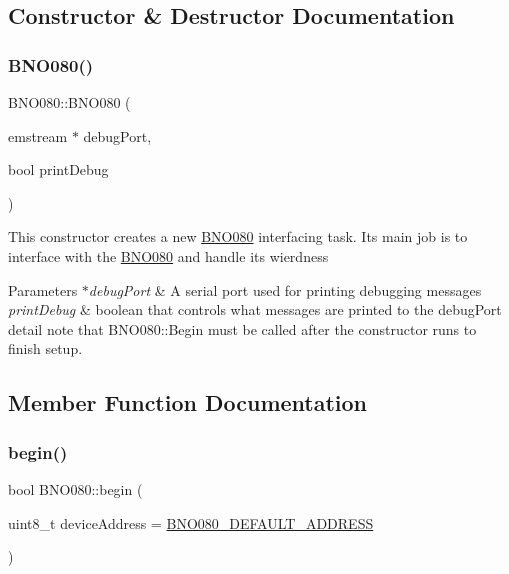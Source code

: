 \subsection{Constructor \& Destructor Documentation}
\mbox{\label{classBNO080_a587f2ceae4b35e407cb76141f371e297}} 
\subsubsection{\texorpdfstring{BNO080()}{BNO080()}}
{\footnotesize\ttfamily B\+N\+O080\+::\+B\+N\+O080 (\begin{DoxyParamCaption}\item[{emstream $\ast$}]{debug\+Port,  }\item[{bool}]{print\+Debug }\end{DoxyParamCaption})}

This constructor creates a new \mbox{\hyperlink{classBNO080}{B\+N\+O080}} interfacing task. Its main job is to interface with the \mbox{\hyperlink{classBNO080}{B\+N\+O080}} and handle it\textquotesingle{}s wierdness 
\begin{DoxyParams}{Parameters}
{\em $\ast$debug\+Port} & A serial port used for printing debugging messages \\
\hline
{\em print\+Debug} & boolean that controls what messages are printed to the debug\+Port detail note that B\+N\+O080\+::\+Begin must be called after the constructor runs to finish setup. \\
\hline
\end{DoxyParams}


\subsection{Member Function Documentation}
\mbox{\label{classBNO080_a90592918c9267e9258e115325ac4b927}} 
\subsubsection{\texorpdfstring{begin()}{begin()}}
{\footnotesize\ttfamily bool B\+N\+O080\+::begin (\begin{DoxyParamCaption}\item[{uint8\+\_\+t}]{device\+Address = {\ttfamily \mbox{\hyperlink{BNO080__Xmega__Lib_8h_a68a3909c1deb2c0e80c8db9a8e1d0e6c}{B\+N\+O080\+\_\+\+D\+E\+F\+A\+U\+L\+T\+\_\+\+A\+D\+D\+R\+E\+SS}}} }\end{DoxyParamCaption})}

